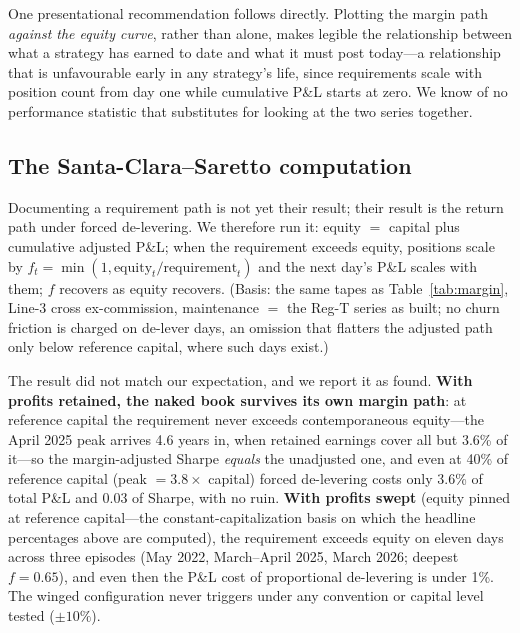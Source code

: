 \documentclass[11pt]{article}
\begin{document}
One presentational recommendation follows directly. Plotting the margin path \emph{against the
equity curve}, rather than alone, makes legible the relationship between what a strategy has
earned to date and what it must post today---a relationship that is unfavourable early in any
strategy's life, since requirements scale with position count from day one while cumulative
P\&L starts at zero. We know of no performance statistic that substitutes for looking at the
two series together.

\subsection*{The Santa-Clara--Saretto computation}
Documenting a requirement path is not yet their result; their result is the return path under
forced de-levering. We therefore run it: equity $=$ capital plus cumulative adjusted P\&L; when
the requirement exceeds equity, positions scale by $f_t = \min(1, \mathrm{equity}_t /
\mathrm{requirement}_t)$ and the next day's P\&L scales with them; $f$ recovers as equity
recovers. (Basis: the same tapes as Table~\ref{tab:margin}, Line-3 cross ex-commission,
maintenance $=$ the Reg-T series as built; no churn friction is charged on de-lever days, an
omission that flatters the adjusted path only below reference capital, where such days exist.)

The result did not match our expectation, and we report it as found. \textbf{With profits
retained, the naked book survives its own margin path}: at reference capital the requirement
never exceeds contemporaneous equity---the April 2025 peak arrives 4.6 years in, when retained
earnings cover all but 3.6\% of it---so the margin-adjusted Sharpe \emph{equals} the unadjusted
one, and even at 40\% of reference capital (peak $= 3.8\times$ capital) forced de-levering
costs only 3.6\% of total P\&L and 0.03 of Sharpe, with no ruin. \textbf{With profits swept}
(equity pinned at reference capital---the constant-capitalization basis on which the headline
percentages above are computed), the requirement exceeds equity on eleven days across three
episodes (May 2022, March--April 2025, March 2026; deepest $f = 0.65$), and even then the P\&L
cost of proportional de-levering is under 1\%. The winged configuration never triggers under
any convention or capital level tested ($\pm 10\%$).
\end{document}

